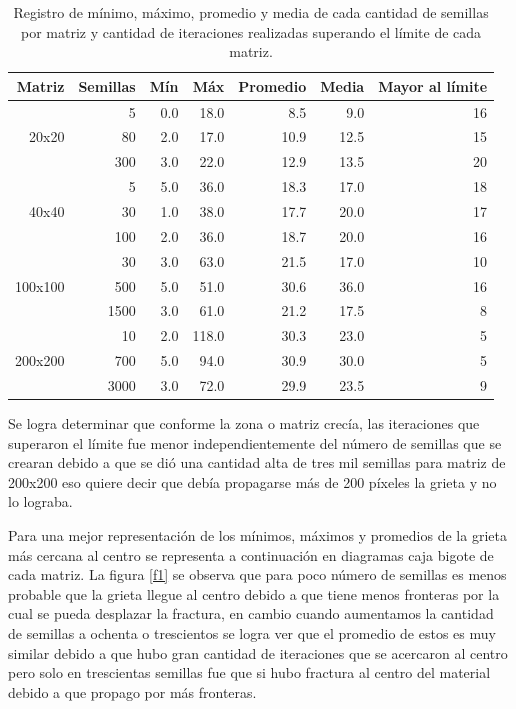 \documentclass[a4paper, 11pt]{article}
\begin{document}
    \begin{table}[H]
        \caption{Registro de mínimo, máximo, promedio y media de cada cantidad de semillas por matriz y cantidad de iteraciones realizadas superando el límite de cada matriz.}
        \bigskip
        \label{tab1}
        \centering
        \begin{tabular}{|r|r|r|r|r|r|r|}
        \hline
         Matriz& Semillas &Mín&Máx&Promedio&Media&Mayor al límite \\
        \hline
             & 5  & 0.0 & 18.0 & 8.5  & 9.0  & 16\\
        20x20& 80 & 2.0 & 17.0 & 10.9 & 12.5 & 15\\
             &300 & 3.0 & 22.0 & 12.9 & 13.5 & 20\\
        \hline
             & 5  & 5.0 & 36.0 & 18.3 & 17.0 & 18\\
        40x40& 30 & 1.0 & 38.0 & 17.7 & 20.0 & 17\\
             &100 & 2.0 & 36.0 & 18.7 & 20.0 & 16\\
        \hline
               & 30  & 3.0 & 63.0 & 21.5 & 17.0 & 10\\
        100x100&500  & 5.0 & 51.0 & 30.6 & 36.0 & 16\\
               &1500 & 3.0 & 61.0 & 21.2 & 17.5 & 8 \\ 
        \hline
               & 10 & 2.0 & 118.0 & 30.3 & 23.0 & 5 \\
        200x200&700 & 5.0 & 94.0  & 30.9 & 30.0 & 5 \\
               &3000& 3.0 & 72.0  & 29.9 & 23.5 & 9 \\
         \hline
        \end{tabular}
    \end{table}
Se logra determinar que conforme la zona o matriz crecía, las iteraciones que superaron el límite fue menor independientemente del número de semillas que se crearan debido a que se dió una cantidad alta de tres mil semillas para matriz de 200x200 eso quiere decir que debía propagarse más de 200 píxeles la grieta y no lo lograba.

Para una mejor representación de los mínimos, máximos y promedios de la grieta más cercana al centro se representa a continuación en diagramas caja bigote de cada matriz.
La figura \ref{f1} se observa que para poco número de semillas es menos probable que la grieta llegue al centro debido a que tiene menos fronteras por la cual se pueda desplazar la fractura, en cambio cuando aumentamos la cantidad de semillas a ochenta o trescientos se logra ver que el promedio de estos es muy similar debido a que hubo gran cantidad de iteraciones que se acercaron al centro pero solo en trescientas semillas fue que si hubo fractura al centro del material debido a que propago por más fronteras.
\end{document}
